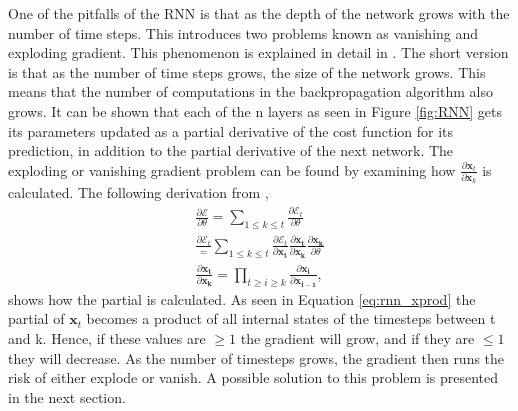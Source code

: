         One of the pitfalls of the RNN is that as the depth of the network grows with the number of time steps. This introduces two problems known as vanishing and exploding gradient. This phenomenon is explained in detail in \cite{Pascanu}. The short version is that as the number of time steps grows, the size of the network grows. This means that the number of computations in the backpropagation algorithm also grows. It can be shown that each of the n layers as seen in Figure \ref{fig:RNN} gets its parameters updated as a partial derivative of the cost function for its prediction, in addition to the partial derivative of the next network. The exploding or vanishing gradient problem can be found by examining how $\frac{\partial \bm x_t}{\partial \bm x_k}$ is calculated. The following derivation from \cite{Pascanu},
        \begin{align}
            \frac{\partial \mathcal{E}}{\partial \theta} = \sum_{1\leq k \leq t}\frac{\partial \mathcal{E}_t}{\partial \theta} \nonumber \\
            \frac{\partial \mathcal{E}_t} = \sum_{1\leq k \leq t}\frac{\partial \mathcal{E}_t}{\partial \bm{x_t}} \frac{\partial \bm{x_t}}{\partial \bm{x_k}}\frac{\partial \bm{x_k}}{\partial \theta} \nonumber \\
            \frac{\partial \bm{x_t}}{\partial \bm{x_k}} = \prod_{t \geq i\geq k} \frac{\partial \bm{x_i}}{\partial \bm{x_{i-1}}}\label{eq:rnn_xprod}, 
        \end{align}
        shows how the partial is calculated. As seen in Equation \ref{eq:rnn_xprod} the partial of $\bm x_t$ becomes a product of all internal states of the timesteps between t and k. Hence, if these values are $\geq1$ the gradient will grow, and if they are $\leq 1$ they will decrease. As the number of timesteps grows, the gradient then runs the risk of either explode or vanish. A possible solution to this problem is presented in the next section.  
    
